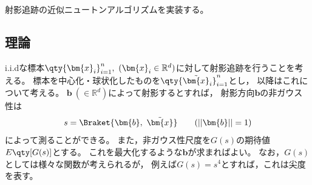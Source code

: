 \documentclass[class=jsarticle, crop=false, dvipdfmx, fleqn]{standalone}
\begin{document}
\section{}

射影追跡の近似ニュートンアルゴリズムを実装する。


\subsection*{理論}

i.i.dな標本\(\qty{\bm{x}_i}_{i=1}^{n},\ (\bm{x}_i \in \mathbb{R}^d)\)に対して射影追跡を行うことを考える。
標本を中心化・球状化したものを\(\qty{\tilde{\bm{x}}_i}_{i=1}^{n}\)とし，
以降はこれについて考える。
\(\bm{b}\ (\in \mathbb{R}^d)\)によって射影するとすれば，
射影方向\(\bm{b}\)の非ガウス性は
\begin{equation}
    s = \Braket{\bm{b},\ \tilde{\bm{x}}} \qquad (||\bm{b}|| = 1)
\end{equation}
によって測ることができる。
また，非ガウス性尺度を\(G(s)\)の期待値\(E\qty[G(s)]\)とする。
これを最大化するような\(\bm{b}\)が求まればよい。
なお，\(G(s)\)としては様々な関数が考えられるが，
例えば\(G(s) = s^4\)とすれば，これは尖度を表す。
\end{document}
